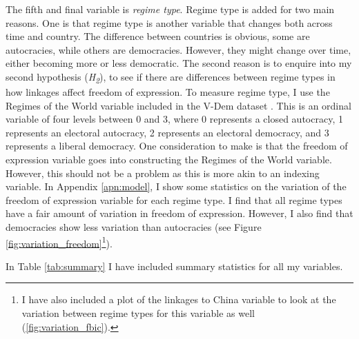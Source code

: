 The fifth and final variable is \textit{regime type}. Regime type is added for two main reasons. One is that regime type is another variable that changes both across time and country. The difference between countries is obvious, some are autocracies, while others are democracies. However, they might change over time, either becoming more or less democratic. The second reason is to enquire into my second hypothesis (\textit{H\textsubscript{2}}), to see if there are differences between regime types in how linkages affect freedom of expression. To measure regime type, I use the Regimes of the World variable included in the V-Dem dataset \citep{coppedge_v-dem_2025}. This is an ordinal variable of four levels between 0 and 3, where 0 represents a closed autocracy, 1 represents an electoral autocracy, 2 represents an electoral democracy, and 3 represents a liberal democracy. One consideration to make is that the freedom of expression variable goes into constructing the Regimes of the World variable. However, this should not be a problem as this is more akin to an indexing variable. In Appendix \ref{apn:model}, I show some statistics on the variation of the freedom of expression variable for each regime type. I find that all regime types have a fair amount of variation in freedom of expression. However, I also find that democracies show less variation than autocracies (see Figure \ref{fig:variation_freedom}\footnote{I have also included a plot of the linkages to China variable to look at the variation between regime types for this variable as well (\ref{fig:variation_fbic}).}).

In Table \ref{tab:summary} I have included summary statistics for all my variables.

